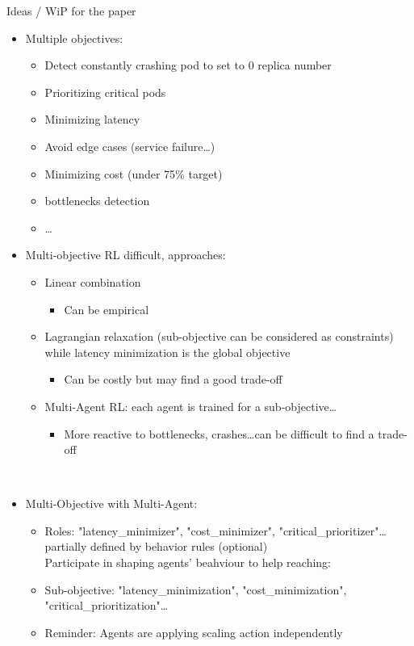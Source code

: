 \documentclass{beamer}
\begin{document}
\begin{frame}[allowframebreaks]{Ideas / WiP for the paper}
\begin{itemize}
        \item Multiple objectives:
        \begin{itemize}
            \item Detect constantly crashing pod to set to 0 replica number
            \item Prioritizing critical pods
            \item Minimizing latency
            \item Avoid edge cases (service failure\dots)
            \item Minimizing cost (under 75\% target)
            \item bottlenecks detection
            \item \dots
        \end{itemize}
        \item Multi-objective RL difficult, approaches:
        \begin{itemize}
            \item Linear combination
            \begin{itemize}
                \item Can be empirical
            \end{itemize}
            \item Lagrangian relaxation (sub-objective can be considered as constraints) while latency minimization is the global objective
            \begin{itemize}
                \item Can be costly but may find a good trade-off
            \end{itemize}
            \item Multi-Agent RL: each agent is trained for a sub-objective\dots
            \begin{itemize}
                \item More reactive to bottlenecks, crashes\dots can be difficult to find a trade-off
            \end{itemize}
        \end{itemize}

        \

        \item Multi-Objective with Multi-Agent:
        \begin{itemize}
            \item Roles: "latency\_minimizer", "cost\_minimizer", "critical\_prioritizer"\dots partially defined by behavior rules (optional)
            \\ Participate in shaping agents' beahviour to help reaching: 
            \item Sub-objective: "latency\_minimization", "cost\_minimization", "critical\_prioritization"\dots
            \item Reminder: Agents are applying scaling action independently
        \end{itemize}
    \end{itemize}
\end{frame}
\end{document}
